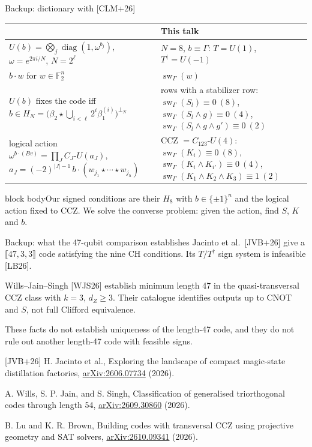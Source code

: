 \documentclass[aspectratio=169,11pt]{beamer}
\newcommand{\sw}{\operatorname{sw}}
\newcommand{\qcode}[3]{\llbracket #1,#2,#3\rrbracket}
\newcommand{\takeaway}[1]{\vfill\begin{beamercolorbox}[sep=1ex,wd=\linewidth]{block body}#1\end{beamercolorbox}}
\newcommand{\source}[1]{\par\vfill{\tiny\color{black!60}\setlength{\parskip}{1pt}#1\par}}
\newcommand{\refWJS}{[WJS26] A. Wills, S. P. Jain, and S. Singh, Classification of generalised triorthogonal codes through length 54, \href{https://arxiv.org/abs/2609.30860}{arXiv:2609.30860} (2026).}
\newcommand{\refJ}{[JVB+26] H. Jacinto et al., Exploring the landscape of compact magic-state distillation factories, \href{https://arxiv.org/abs/2606.07734}{arXiv:2606.07734} (2026).}
\newcommand{\refLB}{[LB26] B. Lu and K. R. Brown, Building codes with transversal CCZ using projective geometry and SAT solvers, \href{https://arxiv.org/abs/2610.09341}{arXiv:2610.09341} (2026).}
\newcommand{\talktext}{\small\setlength{\parskip}{2.5pt}\setlength{\abovedisplayskip}{5pt}\setlength{\belowdisplayskip}{5pt}\setlength{\abovedisplayshortskip}{3pt}\setlength{\belowdisplayshortskip}{3pt}}
\newcommand{\F}{\mathbb F}
\begin{document}
\begin{frame}[label=b-clm]{Backup: dictionary with [CLM+26]}
\talktext
\begin{center}\small\renewcommand{\arraystretch}{1.12}
\begin{tabular}{@{}>{\raggedright\arraybackslash}p{}>{\raggedright\arraybackslash}p{}@{}}\toprule
{[CLM+26]} & This talk\\\midrule
$U(b)=\bigotimes_j\operatorname{diag}(1,\omega^{b_j})$, $\omega=e^{2\pi i/N}$, $N=2^\ell$ & $N=8$, $b\equiv\Gamma$: $T=U(1)$, $T^\dagger=U(-1)$\\
$b\cdot w$ for $w\in\F_2^n$ & $\sw_\Gamma(w)$\\
$U(b)$ fixes the code iff $b\in H_N=\bigl(\beta_2\star\bigcup_{i<\ell}2^i\beta_1^{(i)}\bigr)^{\perp_N}$ & rows with a stabilizer row: $\sw_\Gamma(S_l)\equiv0\ (8)$, $\sw_\Gamma(S_l\wedge g)\equiv0\ (4)$, $\sw_\Gamma(S_l\wedge g\wedge g')\equiv0\ (2)$\\
logical action $\omega^{b\cdot(Bv)}=\prod_JC_J\text{-}U(a_J)$, $a_J=(-2)^{|J|-1}\,b\cdot(w_{j_1}\star\cdots\star w_{j_h})$ & CCZ $=C_{123}\text{-}U(4)$: $\sw_\Gamma(K_i)\equiv0\ (8)$, $\sw_\Gamma(K_i\wedge K_{i'})\equiv0\ (4)$, $\sw_\Gamma(K_1\wedge K_2\wedge K_3)\equiv1\ (2)$\\\bottomrule
\end{tabular}\end{center}
\takeaway{Our signed conditions are their $H_8$ with $b\in\{\pm1\}^n$ and the logical action fixed to CCZ. We solve the converse problem: given the action, find $S$, $K$ and $b$.}
\end{frame}

\begin{frame}[label=b-47]{Backup: what the 47-qubit comparison establishes}
\talktext
Jacinto et al.\ [JVB+26] give a $\qcode{47}{3}{3}$ code satisfying the nine CH conditions. Its $T/T^\dagger$ sign system is infeasible [LB26].
\par\medskip
Wills--Jain--Singh [WJS26] establish minimum length 47 in the quasi-transversal CCZ class with $k=3$, $d_Z\ge3$. Their catalogue identifies outputs up to CNOT and $S$, not full Clifford equivalence.
\par\medskip
These facts do not establish uniqueness of the length-47 code, and they do not rule out another length-47 code with feasible signs.
\source{\refJ\par\refWJS\par\refLB}
\end{frame}
\end{document}
